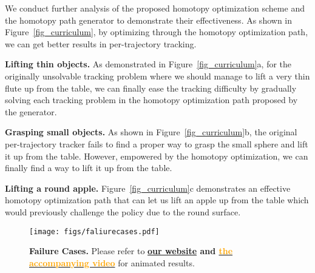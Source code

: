 We conduct further analysis of the proposed homotopy optimization scheme and the homotopy path generator to demonstrate their effectiveness. As shown in Figure~\ref{fig_curriculum}, by optimizing through the homotopy optimization path, we can get better results in per-trajectory tracking. 



\noindent\textbf{Lifting thin objects. } 
As demonstrated in Figure~\ref{fig_curriculum}a, for the originally unsolvable tracking problem where we should manage to lift a very thin flute up from the table, we can finally ease the tracking difficulty by gradually solving each tracking problem in the homotopy optimization path proposed by the generator. 

\noindent\textbf{Grasping small objects. }
As shown in Figure~\ref{fig_curriculum}b, the original per-trajectory tracker fails to find a proper way to grasp the small sphere and lift it up from the table. However, empowered by the homotopy optimization, we can finally find a way to lift it up from the table. 


\noindent\textbf{Lifting a round apple.} Figure~\ref{fig_curriculum}c demonstrates an effective homotopy optimization path that can let us lift an apple up from the table which would previously challenge the policy due to the round surface. 













\begin{figure}[h]
  \centering
  \texttt{[image: figs/faliurecases.pdf]}
  \caption{
  \textbf{Failure Cases. }
  Please refer to \textbf{\href{https://projectwebsite7.github.io/gene-dex-manip/}{our website} and {\href{https://projectwebsite7.github.io/gene-dex-manip/static/videos-lowres/video_7.mp4}{\textcolor{orange}{the accompanying video}}}} for animated results.
  }
  \label{fig_failure_cases}
\end{figure}

